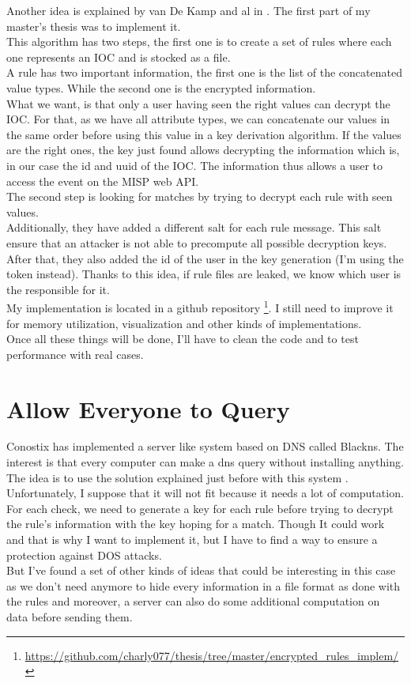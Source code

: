 \documentclass[10pt]{article}
\begin{document}
Another idea is explained by van De Kamp and al in \cite{van2016private}. The first part of my master's thesis was to implement it.\\
This algorithm has two steps, the first one is to create a set of rules where each one represents an IOC and is stocked as a file.\\
A rule has two important information, the first one is the list of the concatenated value types. While the second one is the encrypted information.\\
What we want, is that only a user having seen the right values can decrypt the IOC. For that, as we have all attribute types, we can concatenate our values in the same order before using this value in a key derivation algorithm. If the values are the right ones, the key just found allows decrypting the information which is, in our case the id and uuid of the IOC. The information thus allows a user to access the event on the MISP web API.\\
The second step is looking for matches by trying to decrypt each rule with seen values.\\

Additionally, they have added a different salt for each rule message. This salt ensure that an attacker is not able to precompute all possible decryption keys. After that, they also added the id of the user in the key generation (I'm using the token instead). Thanks to this idea, if rule files are leaked, we know which user is the responsible for it.\\

My implementation is located in a github repository \footnote{\url{https://github.com/charly077/thesis/tree/master/encrypted_rules_implem/}}. I still need to improve it for memory utilization, visualization and other kinds of implementations.\\
Once all these things will be done, I'll have to clean the code and to test performance with real cases.

\section{Allow Everyone to Query}
Conostix has implemented a server like system based on DNS called Blackns. The interest is that every computer can make a dns query without installing anything. The idea is to use the solution explained just before with this system . Unfortunately, I suppose that it will not fit because it needs a lot of computation. For each check, we need to generate a key for each rule before trying to decrypt the rule's information with the key hoping for a match. Though It could work and that is why I want to implement it, but I have to find a way to ensure a protection against DOS attacks.\\
But I've found a set of other kinds of ideas that could be interesting in this case as we don't need anymore to hide every information in a file format as done with the rules and moreover, a server can also do some additional computation on data before sending them.
\end{document}
